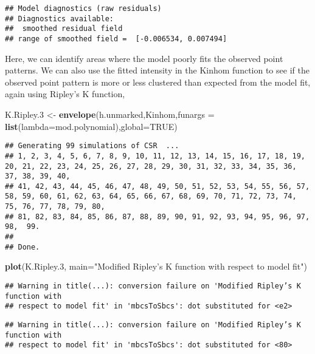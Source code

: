 \documentclass[]{article}
\newenvironment{Shaded}{\begin{snugshade}}{\end{snugshade}}
\newcommand{\DataTypeTok}[1]{\textcolor[rgb]{0.13,0.29,0.53}{#1}}
\newcommand{\FloatTok}[1]{\textcolor[rgb]{0.00,0.00,0.81}{#1}}
\newcommand{\KeywordTok}[1]{\textcolor[rgb]{0.13,0.29,0.53}{\textbf{#1}}}
\newcommand{\NormalTok}[1]{#1}
\newcommand{\OtherTok}[1]{\textcolor[rgb]{0.56,0.35,0.01}{#1}}
\newcommand{\StringTok}[1]{\textcolor[rgb]{0.31,0.60,0.02}{#1}}
\begin{document}
\begin{verbatim}
## Model diagnostics (raw residuals)
## Diagnostics available:
##  smoothed residual field
## range of smoothed field =  [-0.006534, 0.007494]
\end{verbatim}

Here, we can identify areas where the model poorly fits the observed
point patterns. We can also use the fitted intensity in the Kinhom
function to see if the observed point pattern is more or less clustered
than expected from the model fit, again using Ripley's K function,

\begin{Shaded}
\begin{Highlighting}[]
\NormalTok{K.Ripley}\FloatTok{.3}\NormalTok{ <-}\StringTok{ }\KeywordTok{envelope}\NormalTok{(h.unmarked,Kinhom,}\DataTypeTok{funargs =} \KeywordTok{list}\NormalTok{(}\DataTypeTok{lambda=}\NormalTok{mod.polynomial),}\DataTypeTok{global=}\OtherTok{TRUE}\NormalTok{)}
\end{Highlighting}
\end{Shaded}

\begin{verbatim}
## Generating 99 simulations of CSR  ...
## 1, 2, 3, 4, 5, 6, 7, 8, 9, 10, 11, 12, 13, 14, 15, 16, 17, 18, 19, 20, 21, 22, 23, 24, 25, 26, 27, 28, 29, 30, 31, 32, 33, 34, 35, 36, 37, 38, 39, 40,
## 41, 42, 43, 44, 45, 46, 47, 48, 49, 50, 51, 52, 53, 54, 55, 56, 57, 58, 59, 60, 61, 62, 63, 64, 65, 66, 67, 68, 69, 70, 71, 72, 73, 74, 75, 76, 77, 78, 79, 80,
## 81, 82, 83, 84, 85, 86, 87, 88, 89, 90, 91, 92, 93, 94, 95, 96, 97, 98,  99.
## 
## Done.
\end{verbatim}

\begin{Shaded}
\begin{Highlighting}[]
\KeywordTok{plot}\NormalTok{(K.Ripley}\FloatTok{.3}\NormalTok{, }\DataTypeTok{main=}\StringTok{"Modified Ripley’s K function with respect to model fit"}\NormalTok{)}
\end{Highlighting}
\end{Shaded}

\begin{verbatim}
## Warning in title(...): conversion failure on 'Modified Ripley’s K function with
## respect to model fit' in 'mbcsToSbcs': dot substituted for <e2>
\end{verbatim}

\begin{verbatim}
## Warning in title(...): conversion failure on 'Modified Ripley’s K function with
## respect to model fit' in 'mbcsToSbcs': dot substituted for <80>
\end{verbatim}
\end{document}

